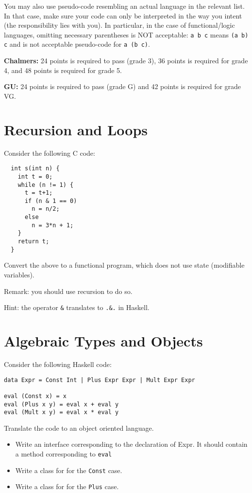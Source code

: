 \documentclass{article}
\begin{document}
You may also use pseudo-code resembling an actual language in the
relevant list. In that case, make sure your code can only be
interpreted in the way you intent (the responsibility lies with
you). In particular, in the case of functional/logic languages,
omitting necessary parentheses is NOT acceptable: \texttt{a b c} means
\texttt{(a b) c} and is not acceptable pseudo-code for \texttt{a (b
  c)}.


\textbf{Chalmers:}
24 points is required to pass (grade 3), 36 points is required for
grade 4, and 48 points is required for grade 5.

\textbf{GU:}
24 points is required to pass (grade G) and 42 points is
required for grade VG.

\section{Recursion and Loops}

Consider the following C code:
\begin{verbatim}
  int s(int n) {
    int t = 0;
    while (n != 1) {
      t = t+1;
      if (n & 1 == 0)
        n = n/2;
      else
        n = 3*n + 1;
    }
    return t;
  }
\end{verbatim}

Convert the above to a functional program, which does not use state (modifiable variables).

Remark: you should use recursion to do so.

Hint: the operator \texttt{\&} translates to \texttt{.\&.} in Haskell.
\section{Algebraic Types and Objects}

Consider the following Haskell code:
\begin{verbatim}
data Expr = Const Int | Plus Expr Expr | Mult Expr Expr

eval (Const x) = x
eval (Plus x y) = eval x + eval y
eval (Mult x y) = eval x * eval y
\end{verbatim}

Translate the code to an object oriented language. 

\begin{itemize}
\item Write an interface corresponding to the declaration of Expr. It should contain a method corresponding to \texttt{eval} 
\item Write a class for for the \texttt{Const} case. 
\item Write a class for for the \texttt{Plus} case. 
\end{itemize}
\end{document}
